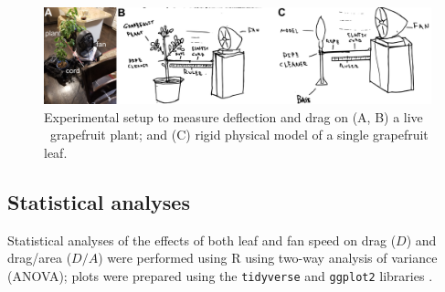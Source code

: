 \begin{figure}
\begin{center}
\includegraphics{figures/fig3.png}
\end{center}
\caption{Experimental setup to measure deflection and drag on (A, B) a live \Cxparadisi\ grapefruit plant; and (C) rigid physical model of a single grapefruit leaf.}
\label{fig:methods:drag}
\end{figure}













\subsection{Statistical analyses}
Statistical analyses of the effects of both leaf and fan speed on drag ($D$) and drag/area ($D/A$) were performed using R \citep{r2020} using two-way analysis of variance (ANOVA); plots were prepared using the \lstinline{tidyverse} and \lstinline{ggplot2} libraries \citep{wickham2019tidyverse}.


















